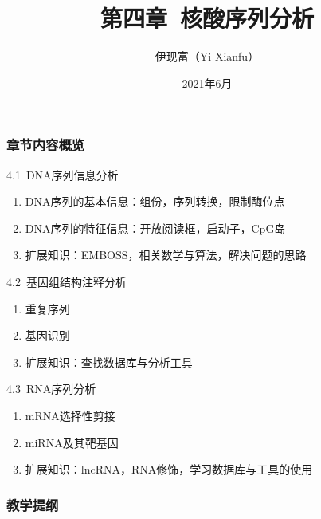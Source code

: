 




\title[核酸序列分析]{第四章\ 核酸序列分析}
\author[Yixf]{伊现富（Yi Xianfu）}
\date{2021年6月}

\begin{frame}
  \titlepage
\end{frame}

\begin{frame}
  \frametitle{章节内容概览}
  \begin{block}{4.1\ DNA序列信息分析}
    \begin{enumerate}
      \item DNA序列的基本信息：组份，序列转换，限制酶位点
      \item DNA序列的特征信息：开放阅读框，启动子，CpG岛
      \item 扩展知识：EMBOSS，相关数学与算法，解决问题的思路
    \end{enumerate}
  \end{block}
  \vspace{-0.2cm}
  \begin{block}{4.2\ 基因组结构注释分析}
    \begin{enumerate}
      \item 重复序列
      \item 基因识别
      \item 扩展知识：查找数据库与分析工具
    \end{enumerate}
  \end{block}
  \vspace{-0.2cm}
  \begin{block}{4.3\ RNA序列分析}
    \begin{enumerate}
      \item mRNA选择性剪接
      \item miRNA及其靶基因
      \item 扩展知识：lncRNA，RNA修饰，学习数据库与工具的使用
    \end{enumerate}
  \end{block}
\end{frame}

\begin{frame}[plain]
  \frametitle{教学提纲}
  \setcounter{tocdepth}{2}
  \begin{multicols}{2}
  \tableofcontents
  \end{multicols}
\end{frame}








